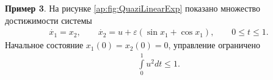 \documentclass[../main.tex]{subfiles}
\begin{document}
   \textbf{Пример 3}. На рисунке \ref{ap:fig:QuaziLinearExp} показано множество достижимости системы 
   \begin{gather}\label{ap:Example3}
   	\dot{x_1} = x_2, \qquad
   	\dot{x_2} = u + \varepsilon(\sin x_1 + \cos x_1) ,\qquad 0\leqslant t  \leqslant 1.
   \end{gather}
   Начальное состояние $x_1(0) = x_2(0) = 0 $, управление ограничено  
   \begin{gather}\label{example3_controls}
   	\int\limits_0^1 u^2dt \leqslant 1.
   \end{gather}
  
\end{document}
